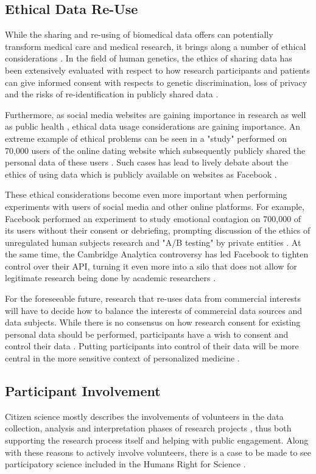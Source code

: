 \documentclass[a4paper,num-refs]{oup-contemporary}
\begin{document}
\subsection{Ethical Data Re-Use}
While the sharing and re-using of biomedical data offers can potentially transform medical care and medical research, it brings along a number of ethical considerations \cite{Mason2017, Ross2018}. In the field of human genetics, the ethics of sharing data has been extensively evaluated with respect to how research participants and patients can give informed consent with respects to genetic discrimination, loss of privacy and the risks of re-identification in publicly shared data \cite{Haeusermann2017, Wang2016}.

Furthermore, as social media websites are gaining importance in research as well as public health \cite{Samerski2018}, ethical data usage considerations are gaining importance. An extreme example of ethical problems  can be seen in a "study" performed on 70,000 users of the online dating website which subsequently publicly shared the personal data of these users \cite{okcupid}. Such cases has lead to lively debate about the ethics of using data which is publicly available on websites as Facebook \cite{Zimmer2010, Zook2017}. 

These ethical considerations become even more important when performing experiments with users of social media and other online platforms. For example, Facebook performed an experiment to study emotional contagion on 700,000 of its users without their consent or debriefing, prompting discussion of the ethics of unregulated human subjects research and "A/B testing" by private entities \cite{Jouhki2016, Hunter2016, Flick2015}. At the same time, the Cambridge Analytica controversy has led Facebook to tighten control over their API, turning it even more into a silo that does not allow for legitimate research being done by academic researchers \cite{facebook_silo}.

For the foreseeable future, research that re-uses data from commercial interests will have to decide how to balance the interests of commercial data sources and data subjects. While there is no consensus on how research consent for existing personal data should be performed, participants have a wish to consent and control their data \cite{Golder2017}. Putting participants into control of their data will be more central in the more sensitive context of personalized medicine \cite{Kossmann2014}.


\subsection{Participant Involvement}
Citizen science mostly describes the involvements of volunteers in the data collection, analysis and interpretation phases of research projects \cite{Pocock2017}, thus both supporting the research process itself and helping with public engagement. Along with these reasons to actively involve volunteers, there is a case to be made to see participatory science included in the Humans Right for Science \cite{Vayena2015a}. 
\end{document}
